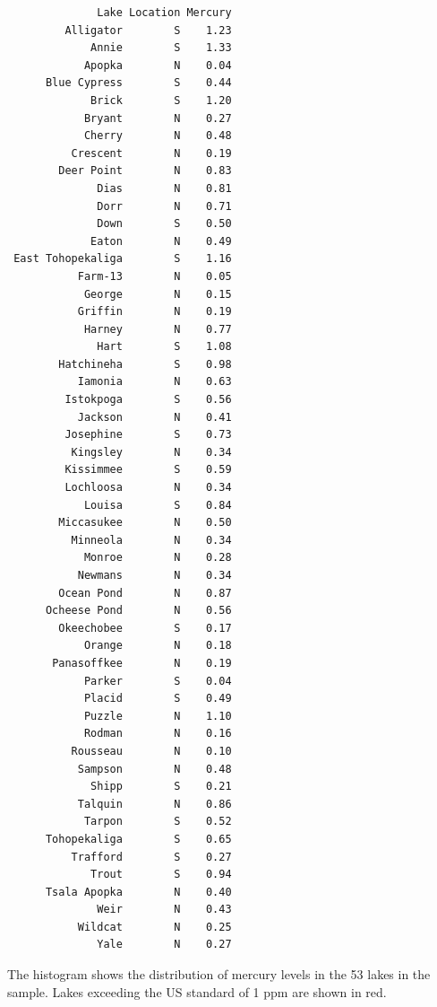 \documentclass[
  letterpaper,
  DIV=11,
  numbers=noendperiod]{scrreprt}
\begin{document}
\begin{verbatim}
              Lake Location Mercury
         Alligator        S    1.23
             Annie        S    1.33
            Apopka        N    0.04
      Blue Cypress        S    0.44
             Brick        S    1.20
            Bryant        N    0.27
            Cherry        N    0.48
          Crescent        N    0.19
        Deer Point        N    0.83
              Dias        N    0.81
              Dorr        N    0.71
              Down        S    0.50
             Eaton        N    0.49
 East Tohopekaliga        S    1.16
           Farm-13        N    0.05
            George        N    0.15
           Griffin        N    0.19
            Harney        N    0.77
              Hart        S    1.08
        Hatchineha        S    0.98
           Iamonia        N    0.63
         Istokpoga        S    0.56
           Jackson        N    0.41
         Josephine        S    0.73
          Kingsley        N    0.34
         Kissimmee        S    0.59
         Lochloosa        N    0.34
            Louisa        S    0.84
        Miccasukee        N    0.50
          Minneola        N    0.34
            Monroe        N    0.28
           Newmans        N    0.34
        Ocean Pond        N    0.87
      Ocheese Pond        N    0.56
        Okeechobee        S    0.17
            Orange        N    0.18
       Panasoffkee        N    0.19
            Parker        S    0.04
            Placid        S    0.49
            Puzzle        N    1.10
            Rodman        N    0.16
          Rousseau        N    0.10
           Sampson        N    0.48
             Shipp        S    0.21
           Talquin        N    0.86
            Tarpon        S    0.52
      Tohopekaliga        S    0.65
          Trafford        S    0.27
             Trout        S    0.94
      Tsala Apopka        N    0.40
              Weir        N    0.43
           Wildcat        N    0.25
              Yale        N    0.27
\end{verbatim}

The histogram shows the distribution of mercury levels in the 53 lakes
in the sample. Lakes exceeding the US standard of 1 ppm are shown in
red.
\end{document}
